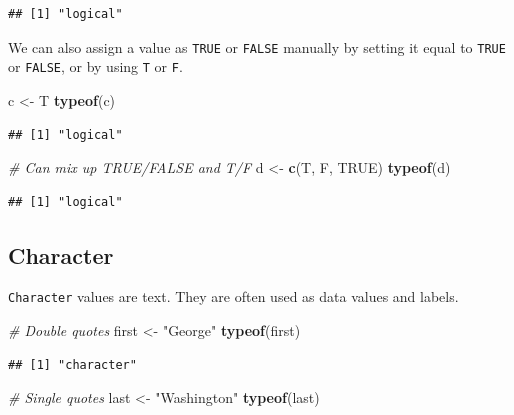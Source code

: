 \documentclass[
]{book}
\newenvironment{Shaded}{\begin{snugshade}}{\end{snugshade}}
\newcommand{\CommentTok}[1]{\textcolor[rgb]{0.56,0.35,0.01}{\textit{#1}}}
\newcommand{\KeywordTok}[1]{\textcolor[rgb]{0.13,0.29,0.53}{\textbf{#1}}}
\newcommand{\NormalTok}[1]{#1}
\newcommand{\OtherTok}[1]{\textcolor[rgb]{0.56,0.35,0.01}{#1}}
\newcommand{\StringTok}[1]{\textcolor[rgb]{0.31,0.60,0.02}{#1}}
\begin{document}
\begin{verbatim}
## [1] "logical"
\end{verbatim}

We can also assign a value as \texttt{TRUE} or \texttt{FALSE} manually by setting it equal to \texttt{TRUE} or \texttt{FALSE}, or by using \texttt{T} or \texttt{F}.

\begin{Shaded}
\begin{Highlighting}[]
\NormalTok{c <-}\StringTok{ }\NormalTok{T}
\KeywordTok{typeof}\NormalTok{(c)}
\end{Highlighting}
\end{Shaded}

\begin{verbatim}
## [1] "logical"
\end{verbatim}

\begin{Shaded}
\begin{Highlighting}[]
\CommentTok{# Can mix up TRUE/FALSE and T/F}
\NormalTok{d <-}\StringTok{ }\KeywordTok{c}\NormalTok{(T, F, }\OtherTok{TRUE}\NormalTok{)}
\KeywordTok{typeof}\NormalTok{(d)}
\end{Highlighting}
\end{Shaded}

\begin{verbatim}
## [1] "logical"
\end{verbatim}

\hypertarget{character}{%
\subsection*{Character}\label{character}}

\texttt{Character} values are text. They are often used as data values and labels.

\begin{Shaded}
\begin{Highlighting}[]
\CommentTok{# Double quotes}
\NormalTok{first <-}\StringTok{ "George"}
\KeywordTok{typeof}\NormalTok{(first)}
\end{Highlighting}
\end{Shaded}

\begin{verbatim}
## [1] "character"
\end{verbatim}

\begin{Shaded}
\begin{Highlighting}[]
\CommentTok{# Single quotes}
\NormalTok{last <-}\StringTok{ "Washington"}
\KeywordTok{typeof}\NormalTok{(last)}
\end{Highlighting}
\end{Shaded}
\end{document}
